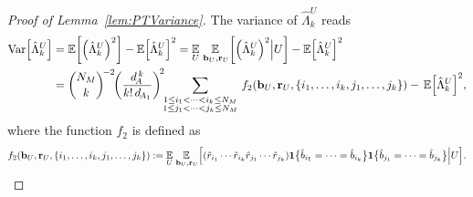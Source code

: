 \documentclass[aps,prl,twocolumn,nofootinbib,superscriptaddress,10pt]{revtex4-2}
\let\originalleft\left
\let\originalright\right
\renewcommand{\left}{\mathopen{}\mathclose\bgroup\originalleft}
\renewcommand{\right}{\aftergroup\egroup\originalright}
\def\E{ {\mathbb E} } %
\DeclareMathOperator{\Var}{Var}
\theoremstyle{plain}
\theoremstyle{definition}
\newcommand{\lref}[1]{Lemma~\ref{#1}}
\begin{document}
\begin{proof}[Proof of \lref{lem:PTVariance}]
The variance of $\hat{\Lambda}_k^{U}$ reads
\begin{align}\label{eq:PTVariance1} 
\Var\left[ \hat{\Lambda}_k^{U} \right] 
&= \E\left[ \left( \hat{\Lambda}_k^{U} \right) ^2 \right] - \E\left[ \hat{\Lambda}_k^{U}  \right]^2 
= \underset{U }{\E} \, \underset{\,\mathbf{b}_{U},\mathbf{r}_{U}}{\E}  \left[ \left( \hat{\Lambda}_k^{U}  \right) ^2 \Big| U \right]
- \E\left[ \hat{\Lambda}_k^{U}  \right]^2 
\nonumber\\
&= \binom{N_M}{k}^{\!-2} \!\left( \frac{d_{\!A}^{\,k}}{k!\, d_{\!A_1} } \right)^{\!2}\!\!
\sum_{\substack{1\leq i_1<\dots<i_k\leq N_M \\ 1\leq j_1<\dots<j_k\leq N_M}} \,
f_2\left( \mathbf{b}_{U},\mathbf{r}_{U},\left\lbrace i_1,\dots,i_k,j_1,\dots,j_k\right\rbrace \right)
- \,\E\left[ \hat{\Lambda}_k^{U}  \right]^2,
\end{align}
where the function $f_2$ is defined as 
\begin{align}\label{eq:definef2}
f_2\left( \mathbf{b}_{U},\mathbf{r}_{U},\left\lbrace i_1,\dots,i_k,j_1,\dots,j_k\right\rbrace \right)
:=
\underset{U }{\E} \, \underset{\,\mathbf{b}_{U},\mathbf{r}_{U}}{\E}  
\Big[
\left( \hat{r}_{i_1}\cdots \hat{r}_{i_k} \hat{r}_{j_1}\cdots \hat{r}_{j_k} \right) \mathbf{1}\big\{\hat{b}_{i_1}=\dots=\hat{b}_{i_k}\big\}
\mathbf{1}\big\{\hat{b}_{j_1}=\dots=\hat{b}_{j_k}\big\} \Big| U \Big]. 
\end{align} 




\end{proof}
\end{document}
